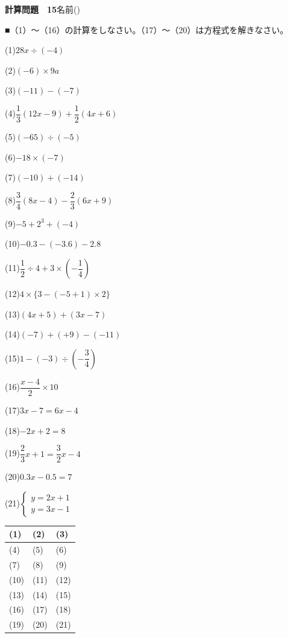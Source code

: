 \documentclass[a4paper,11pt]{ltjsarticle}
\newlength{\qcol}\setlength{\qcol}{0.47\textwidth}
\newlength{\qgap}
\newlength{\anscolw}\setlength{\anscolw}{0.30\textwidth}
\newlength{\ansh}
\newcommand{\Q}[2]{\parbox[t]{\qcol}{\raggedright (#1)\hspace{0.6em}$\displaystyle #2$}}
\newcommand{\QR}[4]{\Q{#1}{#2}\hfill\Q{#3}{#4}\par\vspace{\qgap}}
\newcommand{\anscell}[1]{\rule[-\ansdrop]{0pt}{\ansh}(#1)}
\newlength{\ansdrop}
\begin{document}
{\large\bfseries 計算問題　15}\hfill 名前(\underline{\hspace{32mm}})\par\vspace{3mm}
■（1）〜（16）の計算をしなさい。（17）〜（20）は方程式を解きなさい。\par\vspace{3mm}
\setlength{\qgap}{5.4mm}
\QR{1}{28x\div(-4)}{2}{(-6)\times9a}
\QR{3}{(-11)-(-7)}{4}{\dfrac{1}{3}(12x-9)+\dfrac{1}{2}(4x+6)}
\QR{5}{(-65)\div(-5)}{6}{-18\times(-7)}
\QR{7}{(-10)+(-14)}{8}{\dfrac{3}{4}(8x-4)-\dfrac{2}{3}(6x+9)}
\QR{9}{-5+2^3+(-4)}{10}{-0.3-(-3.6)-2.8}
\QR{11}{\dfrac{1}{2}\div4+3\times\left(-\dfrac{1}{4}\right)}{12}{4\times\{3-(-5+1)\times2\}}
\QR{13}{(4x+5)+(3x-7)}{14}{(-7)+(+9)-(-11)}
\QR{15}{1-(-3)\div\left(-\dfrac{3}{4}\right)}{16}{\dfrac{x-4}{2}\times10}
\QR{17}{3x-7=6x-4}{18}{-2x+2=8}
\QR{19}{\dfrac{2}{3}x+1=\dfrac{3}{2}x-4}{20}{0.3x-0.5=7}
\vspace{1mm}
\Q{21}{\left\{\begin{array}{l} y=2x+1 \\ y=3x-1 \end{array}\right.}\par\vspace{3mm}
\setlength{\ansh}{9.5mm}\setlength{\ansdrop}{6mm}%
\begin{center}\begin{tabular}{|p{\anscolw}|p{\anscolw}|p{\anscolw}|}\hline
\anscell{1} & \anscell{2} & \anscell{3} \\\hline
\anscell{4} & \anscell{5} & \anscell{6} \\\hline
\anscell{7} & \anscell{8} & \anscell{9} \\\hline
\anscell{10} & \anscell{11} & \anscell{12} \\\hline
\anscell{13} & \anscell{14} & \anscell{15} \\\hline
\anscell{16} & \anscell{17} & \anscell{18} \\\hline
\anscell{19} & \anscell{20} & \anscell{21} \\\hline
\end{tabular}\end{center}
\end{document}

